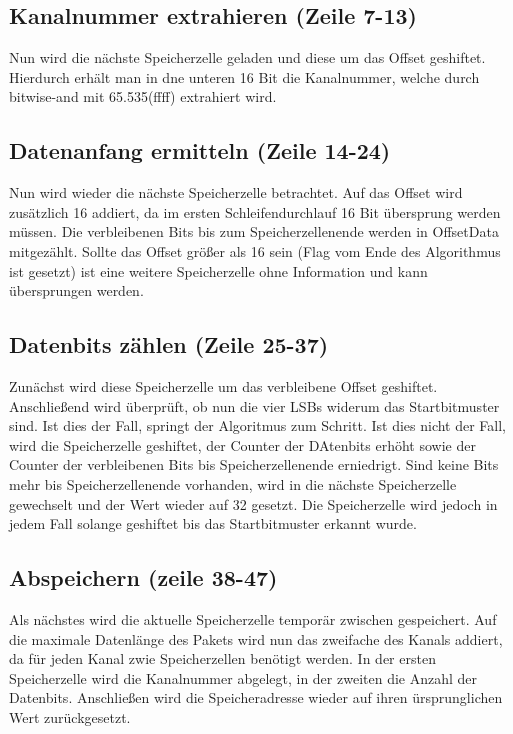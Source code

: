 \documentclass[12pt,titlepage,german,a4]{article}
\begin{document}
    \subsection{Kanalnummer extrahieren (Zeile 7-13)}
    Nun wird die n{\"a}chste Speicherzelle geladen und diese um das Offset geshiftet. Hierdurch erh{\"a}lt man in dne unteren 16 Bit die Kanalnummer, welche durch bitwise-and mit 65.535(ffff) extrahiert wird.

    \subsection{Datenanfang ermitteln (Zeile 14-24)}
    Nun wird wieder die n{\"a}chste Speicherzelle betrachtet. Auf das Offset wird zus{\"a}tzlich 16 addiert, da im ersten Schleifendurchlauf 16 Bit {\"u}bersprung werden m{\"u}ssen. Die verbleibenen Bits bis zum Speicherzellenende werden in OffsetData mitgez{\"a}hlt. Sollte das Offset gr{\"o}ßer als 16 sein (Flag vom Ende des Algorithmus ist gesetzt) ist eine weitere Speicherzelle ohne Information und kann {\"u}bersprungen werden.

    \subsection{Datenbits z{\"a}hlen (Zeile 25-37)}
    Zun{\"a}chst wird diese Speicherzelle um das verbleibene Offset geshiftet. Anschließend wird {\"u}berpr{\"u}ft, ob nun die vier LSBs widerum das Startbitmuster sind. Ist dies der Fall, springt der Algoritmus zum Schritt. Ist dies nicht der Fall, wird die Speicherzelle geshiftet, der Counter der DAtenbits erh{\"o}ht sowie der Counter der verbleibenen Bits bis Speicherzellenende erniedrigt. Sind keine Bits mehr bis Speicherzellenende vorhanden, wird in die n{\"a}chste Speicherzelle gewechselt und der Wert wieder auf 32 gesetzt. Die Speicherzelle wird jedoch in jedem Fall solange geshiftet bis das Startbitmuster erkannt wurde.

    \subsection{Abspeichern (zeile 38-47)}
    Als n{\"a}chstes wird die aktuelle Speicherzelle tempor{\"a}r zwischen gespeichert. Auf die maximale Datenl{\"a}nge des Pakets wird nun das zweifache des Kanals addiert, da f{\"u}r jeden Kanal zwie Speicherzellen ben{\"o}tigt werden. In der ersten Speicherzelle wird die Kanalnummer abgelegt, in der zweiten die Anzahl der Datenbits. Anschließen wird die Speicheradresse wieder auf ihren {\"u}rsprunglichen Wert zur{\"u}ckgesetzt.
\end{document}
